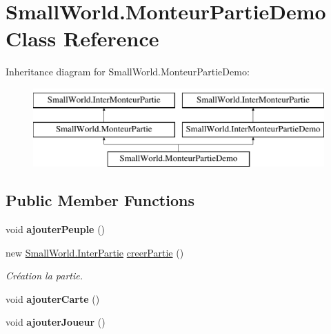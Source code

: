 \hypertarget{class_small_world_1_1_monteur_partie_demo}{\section{Small\-World.\-Monteur\-Partie\-Demo Class Reference}
\label{class_small_world_1_1_monteur_partie_demo}
}
Inheritance diagram for Small\-World.\-Monteur\-Partie\-Demo\-:\begin{figure}[H]
\begin{center}
\leavevmode
\includegraphics[height=3.000000cm]{class_small_world_1_1_monteur_partie_demo}
\end{center}
\end{figure}
\subsection*{Public Member Functions}
\begin{DoxyCompactItemize}
\item 
\hypertarget{class_small_world_1_1_monteur_partie_demo_a46b397bf827fae4e88d4b7d8e05e6a12}{void {\bfseries ajouter\-Peuple} ()}\label{class_small_world_1_1_monteur_partie_demo_a46b397bf827fae4e88d4b7d8e05e6a12}

\item 
\hypertarget{class_small_world_1_1_monteur_partie_demo_a1ff7b2f407c35fbfa2a4adc3311f50ed}{new \hyperlink{interface_small_world_1_1_inter_partie}{Small\-World.\-Inter\-Partie} \hyperlink{class_small_world_1_1_monteur_partie_demo_a1ff7b2f407c35fbfa2a4adc3311f50ed}{creer\-Partie} ()}\label{class_small_world_1_1_monteur_partie_demo_a1ff7b2f407c35fbfa2a4adc3311f50ed}

\begin{DoxyCompactList}\small\item\em Création la partie. \end{DoxyCompactList}\item 
\hypertarget{class_small_world_1_1_monteur_partie_demo_ac94cddf22f61463798b47d7ff609ba06}{void {\bfseries ajouter\-Carte} ()}\label{class_small_world_1_1_monteur_partie_demo_ac94cddf22f61463798b47d7ff609ba06}

\item 
\hypertarget{class_small_world_1_1_monteur_partie_demo_a13aea66c36b2d14f7103e227a8cabdd1}{void {\bfseries ajouter\-Joueur} ()}\label{class_small_world_1_1_monteur_partie_demo_a13aea66c36b2d14f7103e227a8cabdd1}

\end{DoxyCompactItemize}
